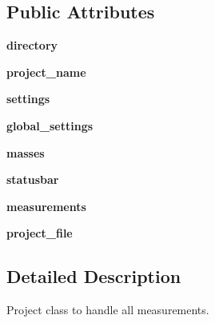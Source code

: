 \subsection*{Public Attributes}
\begin{DoxyCompactItemize}
\item 
\hypertarget{classModules_1_1Project_1_1Project_a4ca9a39c52317a99cb5a63ee8fe2d7be}{{\bfseries directory}}\label{classModules_1_1Project_1_1Project_a4ca9a39c52317a99cb5a63ee8fe2d7be}

\item 
\hypertarget{classModules_1_1Project_1_1Project_acd6ef32f39ac825efa91ad2c50c63117}{{\bfseries project\-\_\-name}}\label{classModules_1_1Project_1_1Project_acd6ef32f39ac825efa91ad2c50c63117}

\item 
\hypertarget{classModules_1_1Project_1_1Project_a66db98ab8316f1b35cb5df58b9dd4cca}{{\bfseries settings}}\label{classModules_1_1Project_1_1Project_a66db98ab8316f1b35cb5df58b9dd4cca}

\item 
\hypertarget{classModules_1_1Project_1_1Project_ac29d11dae4aea275cc6247aecf03eb4e}{{\bfseries global\-\_\-settings}}\label{classModules_1_1Project_1_1Project_ac29d11dae4aea275cc6247aecf03eb4e}

\item 
\hypertarget{classModules_1_1Project_1_1Project_a189dd217f3436b3eec212260786c085b}{{\bfseries masses}}\label{classModules_1_1Project_1_1Project_a189dd217f3436b3eec212260786c085b}

\item 
\hypertarget{classModules_1_1Project_1_1Project_a60c03a0d1e7fe102b926877b8e7914b0}{{\bfseries statusbar}}\label{classModules_1_1Project_1_1Project_a60c03a0d1e7fe102b926877b8e7914b0}

\item 
\hypertarget{classModules_1_1Project_1_1Project_af98cc5dca4e342077fc44f212590360e}{{\bfseries measurements}}\label{classModules_1_1Project_1_1Project_af98cc5dca4e342077fc44f212590360e}

\item 
\hypertarget{classModules_1_1Project_1_1Project_a54961ce1e0e42740a3c7e81154cd75b4}{{\bfseries project\-\_\-file}}\label{classModules_1_1Project_1_1Project_a54961ce1e0e42740a3c7e81154cd75b4}

\end{DoxyCompactItemize}


\subsection{Detailed Description}
\begin{DoxyVerb}Project class to handle all measurements.
\end{DoxyVerb}
 

